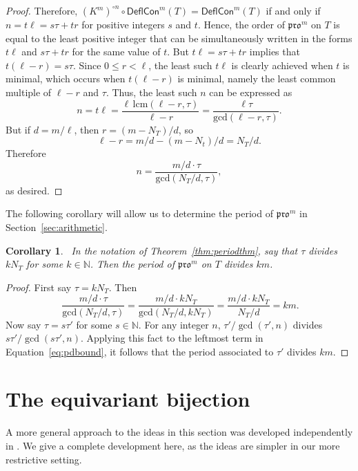 \documentclass[12pt]{amsart}
\newtheorem{corollary}[theorem]{Corollary}
\theoremstyle{definition}
\theoremstyle{remark}
\numberwithin{equation}{section}
\newcommand{\pro}{\mathfrak{pro}}
\newcommand{\compress}{\ensuremath{\mathsf{DeflCon}}}
\begin{document}
\begin{proof}
Therefore, $(K^m)^{\circ n}  \circ \compress^m(T) = \compress^m(T)$ if and only if $n = t \ell = s \tau + t  r$ for positive integers $s$ and $t$. Hence, the order of $\pro^m$ on $T$ is equal to the least positive integer that can be simultaneously written in the forms $t \ell$ and $s \tau + t r$ for the same value of $t$. But $t \ell = s\tau + tr$ implies that $t(\ell-r) = s\tau$. Since $0 \leq r < \ell$, the least such $t \ell$ is clearly achieved when $t$ is minimal, which occurs when $t(\ell-r)$ is minimal, namely the least common multiple of $\ell-r$ and $\tau$. Thus, the least such $n$ can be expressed as 
\begin{equation}\label{eq:period}
n = t \ell = \frac{\ell \, \text{lcm}(\ell-r,\tau)}{\ell-r} = \frac{\ell \tau}{\text{gcd}(\ell-r,\tau)}.
\end{equation}
But if $d = m/\ell$, then $r = (m-N_T)/d$, so \[ \ell - r = m/d - (m-N_t)/d = N_T/d.\]
Therefore
\[ n = \frac{m/d \cdot \tau}{\text{gcd}(N_T/d,\tau)}, \]
as desired. 
\end{proof}

The following corollary will allow us to determine the period of $\pro^m$ in Section~\ref{sec:arithmetic}. 
\\
\begin{corollary}~\label{corr:pdbound}
In the notation of Theorem~\ref{thm:periodthm}, say that $\tau$ divides $k N_T$ for some $k \in \mathbb{N}$. Then the period of $\pro^m$ on $T$ divides $k m$. 
\end{corollary} 
\begin{proof}
First say $\tau = k N_T$. Then
\begin{equation}~\label{eq:pdbound} \frac{m/d \cdot \tau}{\text{gcd}(N_T/d,\tau)} = \frac{m/d \cdot k N_T}{\text{gcd}(N_T/d,k N_T)} = \frac{m/d \cdot k N_T}{N_T/d} = km. 
\end{equation}
Now say $\tau = s \tau'$ for some $s \in \mathbb{N}$. For any integer $n$, $\tau'/\gcd(\tau',n)$ divides $s \tau'/\gcd(s \tau',n)$. Applying this fact to the leftmost term in Equation~\ref{eq:pdbound}, it follows that the period associated to $\tau'$ divides $k m$. 
\end{proof}

\section{The equivariant bijection}\label{sec:equivariant}

A more general approach to the ideas in this section was developed independently in \cite{Dilks.Striker.Vorland}. We give a complete development here, as the ideas are simpler in our more restrictive setting.
\end{document}
